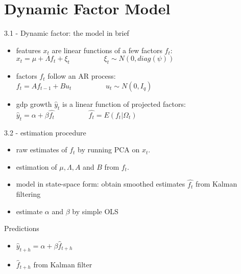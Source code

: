 \section{Dynamic Factor Model}

\begin{frame}{3.1 - Dynamic factor: the model in brief}
	\begin{itemize}
		\item features $x_t$ are linear functions of a few factors $f_t$: \\
		$x_t = \mu + \Lambda f_t + \xi_t \hspace{2cm} \xi_t \sim N(0, diag(\psi))$
		\item factors $f_t$ follow an AR process: \\
		$f_t = A f_{t-1} + B u_t \hspace{2cm} u_t \sim N(0, I_q)$
		\item gdp growth $\hat{y}_t$ is a linear function of projected factors: \\
		$\hat{y}_t = \alpha + \beta \hat{f_t} \hspace{2cm} \hat{f_t} = E(f_t|\Omega_t)$
	\end{itemize}
\end{frame}

\begin{frame}{3.2 - estimation procedure}
	\begin{itemize}
		\item raw estimates of $f_t$ by running PCA on $x_t$.
		\item estimation of $\mu, \Lambda, A$ and $B$ from $f_t$.
		\item model in state-space form: obtain smoothed estimates $\hat{f_t}$ from Kalman filtering
		\item estimate $\alpha$ and $\beta$ by simple OLS
	\end{itemize}
	\pause
	\begin{block}{Predictions}
		\begin{itemize}
			\item $\hat{y}_{t+h} = \alpha + \beta \hat{f}_{t+h}$
			\item $\hat{f}_{t+h}$ from Kalman filter
		\end{itemize}
	\end{block}
\end{frame}
